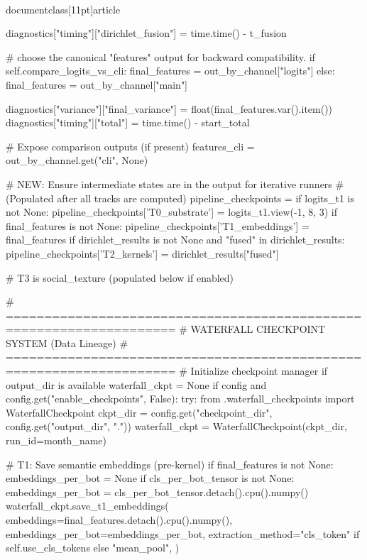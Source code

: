\\documentclass[11pt]{article}
\begin{document}
\begin{CodeBlock}
            diagnostics["timing"]["dirichlet_fusion"] = time.time() - t_fusion

        # choose the canonical "features" output for backward compatibility.
        if self.compare_logits_vs_cli:
            final_features = out_by_channel["logits"]
        else:
            final_features = out_by_channel["main"]

        diagnostics["variance"]["final_variance"] = float(final_features.var().item())
        diagnostics["timing"]["total"] = time.time() - start_total

        # Expose comparison outputs (if present)
        features_cli = out_by_channel.get("cli", None)

        # NEW: Ensure intermediate states are in the output for iterative runners
        # (Populated after all tracks are computed)
        pipeline_checkpoints = {}
        if logits_t1 is not None:
            pipeline_checkpoints['T0_substrate'] = logits_t1.view(-1, 8, 3)
        if final_features is not None:
            pipeline_checkpoints['T1_embeddings'] = final_features
        if dirichlet_results is not None and "fused" in dirichlet_results:
            pipeline_checkpoints['T2_kernels'] = dirichlet_results["fused"]
        
        # T3 is social_texture (populated below if enabled)

        # ====================================================================
        # WATERFALL CHECKPOINT SYSTEM (Data Lineage)
        # ====================================================================
        # Initialize checkpoint manager if output_dir is available
        waterfall_ckpt = None
        if config and config.get("enable_checkpoints", False):
            try:
                from .waterfall_checkpoints import WaterfallCheckpoint
                ckpt_dir = config.get("checkpoint_dir", config.get("output_dir", "."))
                waterfall_ckpt = WaterfallCheckpoint(ckpt_dir, run_id=month_name)

                # T1: Save semantic embeddings (pre-kernel)
                if final_features is not None:
                    embeddings_per_bot = None
                    if cls_per_bot_tensor is not None:
                        embeddings_per_bot = cls_per_bot_tensor.detach().cpu().numpy()
                    waterfall_ckpt.save_t1_embeddings(
                        embeddings=final_features.detach().cpu().numpy(),
                        embeddings_per_bot=embeddings_per_bot,
                        extraction_method="cls_token" if self.use_cls_tokens else "mean_pool",
                    )


\end{CodeBlock}
\end{document}
